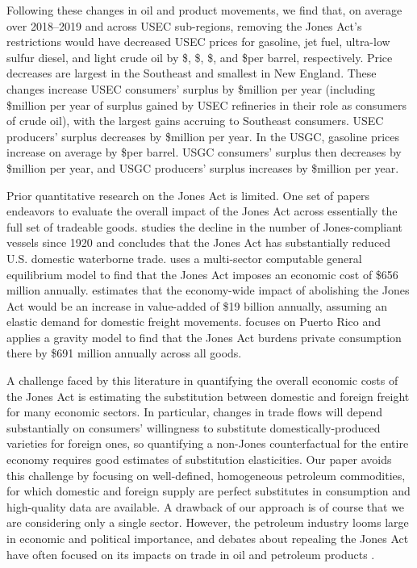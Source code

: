 \documentclass[12pt]{article}
\begin{document}
Following these changes in oil and product movements, we find that, on average over 2018--2019 and across USEC sub-regions, removing the Jones Act's restrictions would have decreased USEC prices for gasoline, jet fuel, ultra-low sulfur diesel, and light crude oil by \$\unskip, \$\unskip, \$\unskip, and \$per barrel, respectively. Price decreases are largest in the Southeast and smallest in New England. These changes increase USEC consumers' surplus by \$million per year (including \$million per year of surplus gained by USEC refineries in their role as consumers of crude oil), with the largest gains accruing to Southeast consumers. USEC producers' surplus decreases by \$million per year. In the USGC, gasoline prices increase on average by \$per barrel. USGC consumers' surplus then decreases by \$million per year, and USGC producers' surplus increases by \$million per year.

Prior quantitative research on the Jones Act is limited. One set of papers endeavors to evaluate the overall impact of the Jones Act across essentially the full set of tradeable goods. \cite{olney2020} studies the decline in the number of Jones-compliant vessels since 1920 and concludes that the Jones Act has substantially reduced U.S. domestic waterborne trade. \cite{USITC2002} uses a multi-sector computable general equilibrium model to find that the Jones Act imposes an economic cost of \$656 million annually. \cite{OECD2019} estimates that the economy-wide impact of abolishing the Jones Act would be an increase in value-added of \$19 billion annually, assuming an elastic demand for domestic freight movements. \cite{hillberryjimenez2022} focuses on Puerto Rico and applies a gravity model to find that the Jones Act burdens private consumption there by \$691 million annually across all goods. 

A challenge faced by this literature in quantifying the overall economic costs of the Jones Act is estimating the substitution between domestic and foreign freight for many economic sectors. In particular, changes in trade flows will depend substantially on consumers' willingness to substitute domestically-produced varieties for foreign ones, so quantifying a non-Jones counterfactual for the entire economy requires good estimates of substitution elasticities. Our paper avoids this challenge by focusing on well-defined, homogeneous petroleum commodities, for which domestic and foreign supply are perfect substitutes in consumption and high-quality data are available. A drawback of our approach is of course that we are considering only a single sector. However, the petroleum industry looms large in economic and political importance, and debates about repealing the Jones Act have often focused on its impacts on trade in oil and petroleum products \citep{coleman2017,Cato2018,AEI2020,CatoJPMorgan2022,BbgJPMorgan2022}.
\end{document}
